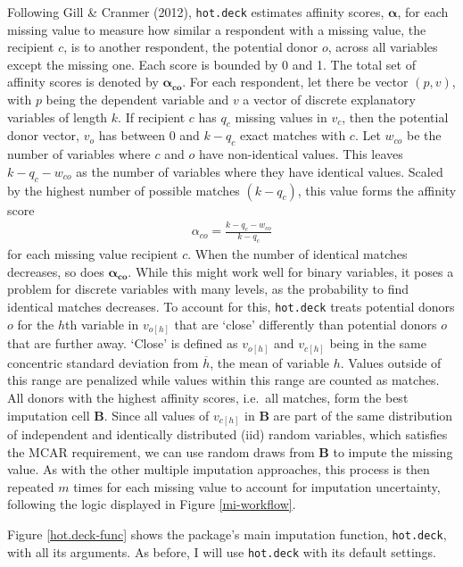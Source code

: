 \documentclass[12pt,econ]{sources/authesis}
\begin{document}
Following Gill \& Cranmer (2012), \texttt{hot.deck} estimates affinity scores, \(\bm{\alpha}\), for each missing value to measure how similar a respondent with a missing value, the recipient \(c\), is to another respondent, the potential donor \(o\), across all variables except the missing one. Each score is bounded by 0 and 1. The total set of affinity scores is denoted by \(\bm{\alpha_{co}}\). For each respondent, let there be vector \((p, v)\), with \(p\) being the dependent variable and \(v\) a vector of discrete explanatory variables of length \(k\). If recipient \(c\) has \(q_c\) missing values in \(v_c\), then the potential donor vector, \(v_o\) has between 0 and \(k-q_c\) exact matches with \(c\). Let \(w_{co}\) be the number of variables where \(c\) and \(o\) have non-identical values. This leaves \(k-q_c -w_{co}\) as the number of variables where they have identical values. Scaled by the highest number of possible matches \((k-q_c)\), this value forms the affinity score
\begin{align}
\alpha_{co} = \frac{k-q_c-w_{co}}{k-q_c}
\end{align}
for each missing value recipient \(c\). When the number of identical matches decreases, so does \(\bm{\alpha_{co}}\). While this might work well for binary variables, it poses a problem for discrete variables with many levels, as the probability to find identical matches decreases. To account for this, \texttt{hot.deck} treats potential donors \(o\) for the \(h\)th variable in \(v_{o[h]}\) that are `close' differently than potential donors \(o\) that are further away. `Close' is defined as \(v_{o[h]}\) and \(v_{c[h]}\) being in the same concentric standard deviation from \(\overline{h}\), the mean of variable \(h\). Values outside of this range are penalized while values within this range are counted as matches. All donors with the highest affinity scores, i.e.~all matches, form the best imputation cell \(\bm{B}\). Since all values of \(v_{c[h]}\) in \(\bm{B}\) are part of the same distribution of independent and identically distributed (iid) random variables, which satisfies the MCAR requirement, we can use random draws from \(\bm{B}\) to impute the missing value. As with the other multiple imputation approaches, this process is then repeated \(m\) times for each missing value to account for imputation uncertainty, following the logic displayed in Figure \ref{mi-workflow}.

Figure \ref{hot.deck-func} shows the package's main imputation function, \texttt{hot.deck}, with all its arguments. As before, I will use \texttt{hot.deck} with its default settings.
\end{document}
